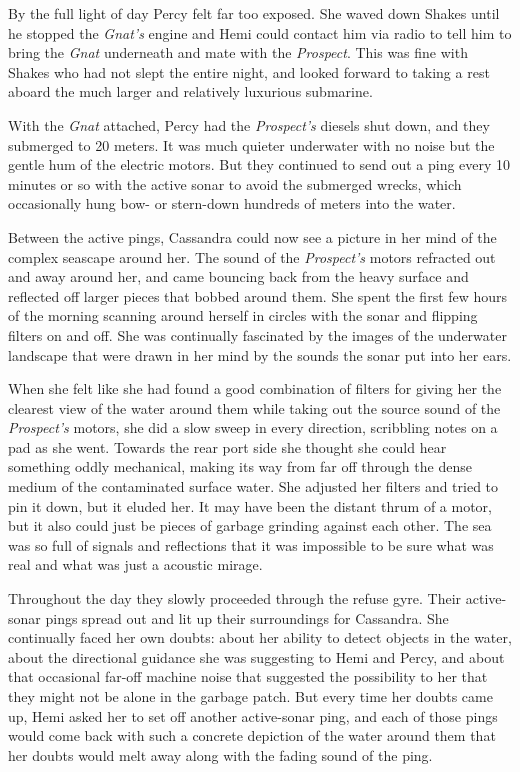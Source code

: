 \documentclass[
]{scrbook}
\begin{document}
By the full light of day Percy felt far too exposed. She waved down
Shakes until he stopped the \emph{Gnat's} engine and Hemi could contact
him via radio to tell him to bring the \emph{Gnat} underneath and mate
with the \emph{Prospect}. This was fine with Shakes who had not slept
the entire night, and looked forward to taking a rest aboard the much
larger and relatively luxurious submarine.

With the \emph{Gnat} attached, Percy had the \emph{Prospect's} diesels
shut down, and they submerged to 20 meters. It was much quieter
underwater with no noise but the gentle hum of the electric motors. But
they continued to send out a ping every 10 minutes or so with the active
sonar to avoid the submerged wrecks, which occasionally hung bow- or
stern-down hundreds of meters into the water.

Between the active pings, Cassandra could now see a picture in her mind
of the complex seascape around her. The sound of the \emph{Prospect's}
motors refracted out and away around her, and came bouncing back from
the heavy surface and reflected off larger pieces that bobbed around
them. She spent the first few hours of the morning scanning around
herself in circles with the sonar and flipping filters on and off. She
was continually fascinated by the images of the underwater landscape
that were drawn in her mind by the sounds the sonar put into her ears.

When she felt like she had found a good combination of filters for
giving her the clearest view of the water around them while taking out
the source sound of the \emph{Prospect's} motors, she did a slow sweep
in every direction, scribbling notes on a pad as she went. Towards the
rear port side she thought she could hear something oddly mechanical,
making its way from far off through the dense medium of the contaminated
surface water. She adjusted her filters and tried to pin it down, but it
eluded her. It may have been the distant thrum of a motor, but it also
could just be pieces of garbage grinding against each other. The sea was
so full of signals and reflections that it was impossible to be sure
what was real and what was just a acoustic mirage.

Throughout the day they slowly proceeded through the refuse gyre. Their
active-sonar pings spread out and lit up their surroundings for
Cassandra. She continually faced her own doubts: about her ability to
detect objects in the water, about the directional guidance she was
suggesting to Hemi and Percy, and about that occasional far-off machine
noise that suggested the possibility to her that they might not be alone
in the garbage patch. But every time her doubts came up, Hemi asked her
to set off another active-sonar ping, and each of those pings would come
back with such a concrete depiction of the water around them that her
doubts would melt away along with the fading sound of the ping.
\end{document}
